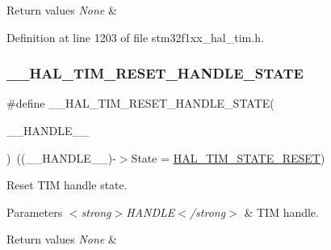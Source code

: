 \begin{DoxyRetVals}{Return values}
{\em None} & \\
\hline
\end{DoxyRetVals}


Definition at line 1203 of file stm32f1xx\+\_\+hal\+\_\+tim.\+h.

\mbox{\label{group___t_i_m___exported___macros_gace20fd4e38231b9682fbc83a80ec19a3}} 
\subsubsection{\texorpdfstring{\+\_\+\+\_\+\+H\+A\+L\+\_\+\+T\+I\+M\+\_\+\+R\+E\+S\+E\+T\+\_\+\+H\+A\+N\+D\+L\+E\+\_\+\+S\+T\+A\+TE}{\_\_HAL\_TIM\_RESET\_HANDLE\_STATE}}
{\footnotesize\ttfamily \#define \+\_\+\+\_\+\+H\+A\+L\+\_\+\+T\+I\+M\+\_\+\+R\+E\+S\+E\+T\+\_\+\+H\+A\+N\+D\+L\+E\+\_\+\+S\+T\+A\+TE(\begin{DoxyParamCaption}\item[{}]{\+\_\+\+\_\+\+H\+A\+N\+D\+L\+E\+\_\+\+\_\+ }\end{DoxyParamCaption})~((\+\_\+\+\_\+\+H\+A\+N\+D\+L\+E\+\_\+\+\_\+)-\/$>$State = \hyperlink{group___t_i_m___exported___types_ggae0994cf5970e56ca4903e9151f40010ca28011b79e60b74a6c55947c505c51cbc}{H\+A\+L\+\_\+\+T\+I\+M\+\_\+\+S\+T\+A\+T\+E\+\_\+\+R\+E\+S\+ET})}



Reset T\+IM handle state. 


\begin{DoxyParams}{Parameters}
{\em $<$strong$>$\+H\+A\+N\+D\+L\+E$<$/strong$>$} & T\+IM handle. \\
\hline
\end{DoxyParams}

\begin{DoxyRetVals}{Return values}
{\em None} & \\
\hline
\end{DoxyRetVals}


